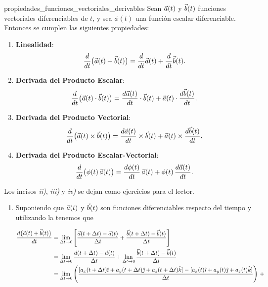 \begin{theorem}{}{propiedades_funciones_vectoriales_derivables}
    Sean $\vec{a}(t)$ y $\vec{b}(t)$ funciones vectoriales diferenciables de $t$, y sea $\phi(t)$ una función escalar diferenciable. Entonces se cumplen las siguientes propiedades:
    \begin{enumerate}[label=\textit{\roman*)}]
        \item \textbf{Linealidad}:
        $$\frac{d}{dt} \bigl(\vec{a}(t) + \vec{b}(t)\bigr) = \frac{d}{dt}\vec{a}(t) + \frac{d}{dt}\vec{b}(t).$$
        \item \textbf{Derivada del Producto Escalar}:
        $$\frac{d}{dt} \bigl(\vec{a}(t) \cdot \vec{b}(t)\bigr) = \frac{d\vec{a}(t)}{dt} \cdot \vec{b}(t) + \vec{a}(t) \cdot \frac{d\vec{b}(t)}{dt}.$$
        \item \textbf{Derivada del Producto Vectorial}:
        $$\frac{d}{dt} \bigl(\vec{a}(t) \times \vec{b}(t)\bigr) = \frac{d\vec{a}(t)}{dt} \times \vec{b}(t) + \vec{a}(t) \times \frac{d\vec{b}(t)}{dt}.$$
        \item \textbf{Derivada del Producto Escalar-Vectorial}:
        $$\frac{d}{dt} \bigl(\phi(t)\,\vec{a}(t)\bigr) = \frac{d\phi(t)}{dt}\,\vec{a}(t) + \phi(t)\,\frac{d\vec{a}(t)}{dt}.$$
    \end{enumerate}
    \begin{demo}
        Los incisos \textit{\creato\selectfont\color{mainc}ii)}, \textit{\creato\selectfont\color{mainc}iii)} y \textit{\creato\selectfont\color{mainc}iv)} se dejan como ejercicios para el lector.
        \begin{enumerate}[label=\textit{\roman*)}]
            \item Suponiendo que $\vec{a}(t)$ y $\vec{b}(t)$ son funciones diferenciables respecto del tiempo y utilizando la  tenemos que
                \begin{fullwidth}[      width=\dimexpr\textwidth-\marginparsep-2cm\relax,%
                                  outermargin=\dimexpr-2cm-\marginparsep\relax]%
                    \begin{align*}
                        \frac{d \bigl(\veca(t) + \vecb(t)\bigr)}{dt} & = \lim_{\Deltat \to 0} \left[\frac{\veca(t + \Deltat) - \veca(t)}{\Deltat} + \frac{\vecb(t + \Deltat) - \vecb(t)}{\Deltat}\right] \\
                        & = \lim_{\Deltat \to 0} \frac{\veca(t + \Deltat) - \veca(t)}{\Deltat} + \lim_{\Deltat \to 0} \frac{\vecb(t + \Deltat) - \vecb(t)}{\Deltat} \\
                        & = \lim_{\Deltat \to 0} \left(\frac{[a_x(t + \Deltat)\veci + a_y(t + \Deltat)\vecj + a_z(t + \Deltat)\veck] - [a_x(t)\veci + a_y(t)\vecj + a_z(t)\veck]}{\Deltat}\right) \, + \\

\end{align*}
\end{fullwidth}
\end{enumerate}
\end{demo}
\end{theorem}
